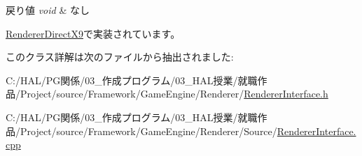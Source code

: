 \begin{DoxyRetVals}{戻り値}
{\em void} & なし \\
\hline
\end{DoxyRetVals}


\mbox{\hyperlink{class_renderer_direct_x9_af7ff314cbaa894d71e37c10565002f8f}{Renderer\+Direct\+X9}}で実装されています。



このクラス詳解は次のファイルから抽出されました\+:\begin{DoxyCompactItemize}
\item 
C\+:/\+H\+A\+L/\+P\+G関係/03\+\_\+作成プログラム/03\+\_\+\+H\+A\+L授業/就職作品/\+Project/source/\+Framework/\+Game\+Engine/\+Renderer/\mbox{\hyperlink{_renderer_interface_8h}{Renderer\+Interface.\+h}}\item 
C\+:/\+H\+A\+L/\+P\+G関係/03\+\_\+作成プログラム/03\+\_\+\+H\+A\+L授業/就職作品/\+Project/source/\+Framework/\+Game\+Engine/\+Renderer/\+Source/\mbox{\hyperlink{_renderer_interface_8cpp}{Renderer\+Interface.\+cpp}}\end{DoxyCompactItemize}

